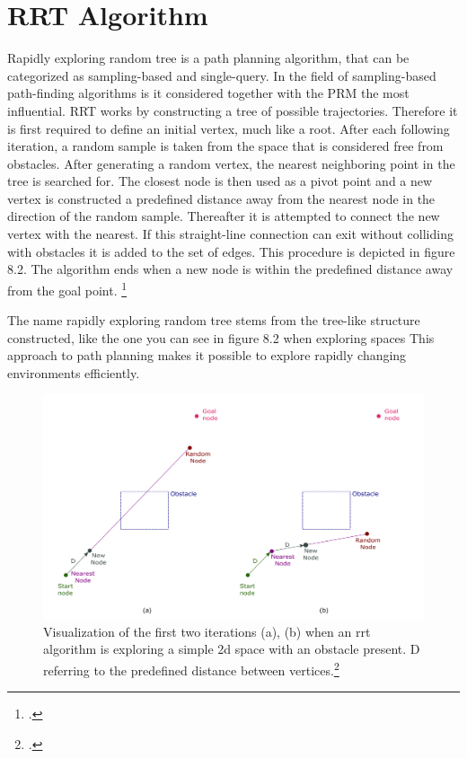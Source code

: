 \section{RRT Algorithm}

Rapidly exploring random tree is a path planning algorithm, that can be categorized as sampling-based and single-query. In the field of sampling-based path-finding algorithms is it considered together with the PRM the most influential. RRT works by constructing a tree of possible trajectories. Therefore it is first required to define an initial vertex, much like a root. After each following iteration, a random sample is taken from the space that is considered free from obstacles. After generating a random vertex, the nearest neighboring point in the tree is searched for. The closest node is then used as a pivot point and a new vertex is constructed a predefined distance away from the nearest node in the direction of the random sample. Thereafter it is attempted to connect the new vertex with the nearest. If this straight-line connection can exit without colliding with obstacles it is added to the set of edges. This procedure is depicted in figure 8.2. The algorithm ends when a new node is within the predefined distance away from the goal point. 
\footcite{Karaman2011}

The name rapidly exploring random tree stems from the tree-like structure constructed, like the one you can see in figure 8.2 when exploring spaces This approach to path planning makes it possible to explore rapidly changing environments efficiently.


\begin{figure}[h]
	\centering
	\includegraphics[width=0.9\linewidth]{img/rrtIteration}
	\caption{Visualization of the first two iterations (a), (b) when an rrt algorithm is exploring a simple 2d space with an obstacle present. D referring to the predefined distance between vertices.\footcite{Zammit2018}}
	\label{fig:path_planning_rrt}
\end{figure}

